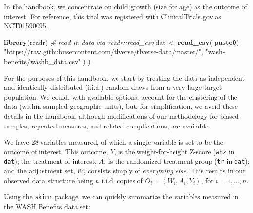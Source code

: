 \documentclass[12pt, krantz2,]{book}
\newenvironment{Shaded}{\begin{snugshade}}{\end{snugshade}}
\newcommand{\CommentTok}[1]{\textcolor[rgb]{0.56,0.35,0.01}{\textit{#1}}}
\newcommand{\KeywordTok}[1]{\textcolor[rgb]{0.13,0.29,0.53}{\textbf{#1}}}
\newcommand{\NormalTok}[1]{#1}
\newcommand{\StringTok}[1]{\textcolor[rgb]{0.31,0.60,0.02}{#1}}
\theoremstyle{definition}
\theoremstyle{definition}
\theoremstyle{definition}
\newcommand{\1}{\mathbbm{1}}
\begin{document}
In the handbook, we concentrate on child growth (size for age) as the outcome of
interest. For reference, this trial was registered with ClinicalTrials.gov as
NCT01590095.

\begin{Shaded}
\begin{Highlighting}[]
\KeywordTok{library}\NormalTok{(readr)}
\CommentTok{# read in data via readr::read_csv}
\NormalTok{dat <-}\StringTok{ }\KeywordTok{read_csv}\NormalTok{(}
  \KeywordTok{paste0}\NormalTok{(}
    \StringTok{"https://raw.githubusercontent.com/tlverse/tlverse-data/master/"}\NormalTok{,}
    \StringTok{"wash-benefits/washb_data.csv"}
\NormalTok{  )}
\NormalTok{)}
\end{Highlighting}
\end{Shaded}

For the purposes of this handbook, we start by treating the data as independent
and identically distributed (i.i.d.) random draws from a very large target
population. We could, with available options, account for the clustering of the
data (within sampled geographic units), but, for simplification, we avoid these
details in the handbook, although modifications of our methodology for biased
samples, repeated measures, and related complications, are available.

We have 28 variables measured, of which a single variable is set to
be the outcome of interest. This outcome, \(Y\), is the weight-for-height Z-score
(\texttt{whz} in \texttt{dat}); the treatment of interest, \(A\), is the randomized treatment
group (\texttt{tr} in \texttt{dat}); and the adjustment set, \(W\), consists simply of
\emph{everything else}. This results in our observed data structure being \(n\) i.i.d.
copies of \(O_i = (W_i, A_i, Y_i)\), for \(i = 1, \ldots, n\).

Using the \href{https://CRAN.R-project.org/package=skimr}{\texttt{skimr} package}, we can
quickly summarize the variables measured in the WASH Benefits data set:
\end{document}
